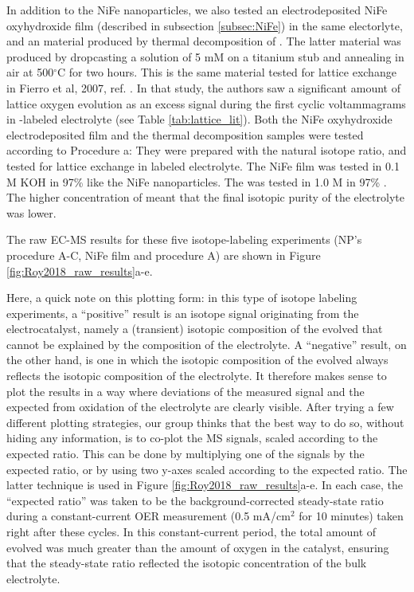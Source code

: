 In addition to the NiFe nanoparticles, we also tested an electrodeposited NiFe oxyhydroxide film (described in subsection \ref{subsec:NiFe}) in the same electorlyte, and an  material produced by thermal decomposition of . The latter material was produced by dropcasting a solution of 5 mM  on a titanium stub and annealing in air at 500$^\circ$C for two hours. This is the same material tested for lattice exchange in Fierro et al, 2007, ref. . In that study, the authors saw a significant amount of lattice oxygen evolution as an excess  signal during the first cyclic voltammagrams in -labeled electrolyte (see Table \ref{tab:lattice_lit}). Both the NiFe oxyhydroxide electrodeposited film and the thermal decomposition  samples were tested according to Procedure a: They were prepared with the natural isotope ratio, and tested for lattice exchange in labeled electrolyte. The NiFe film was tested in 0.1 M KOH in 97\%  like the NiFe nanoparticles. The  was tested in 1.0 M  in 97\% . The higher concentration of  meant that the final isotopic purity of the electrolyte was lower.

The raw EC-MS results for these five isotope-labeling experiments (NP's procedure A-C, NiFe film and  procedure A) are shown in Figure \ref{fig:Roy2018_raw_results}a-e. 

Here, a quick note on this plotting form: in this type of isotope labeling experiments, a ``positive'' result is an isotope signal originating from the electrocatalyst, namely a (transient) isotopic composition of the evolved  that cannot be explained by the composition of the electrolyte. A ``negative'' result, on the other hand, is one in which the isotopic composition of the evolved  always reflects the isotopic composition of the electrolyte. It therefore makes sense to plot the results in a way where deviations of the measured  signal and the expected  from oxidation of the electrolyte are clearly visible. After trying a few different plotting strategies, our group thinks that the best way to do so, without hiding any information, is to co-plot the MS signals, scaled according to the expected ratio. This can be done by multiplying one of the signals by the expected ratio, or by using two y-axes scaled according to the expected ratio. The latter technique is used in Figure \ref{fig:Roy2018_raw_results}a-e. In each case, the ``expected ratio'' was taken to be the background-corrected steady-state ratio during a constant-current OER measurement (0.5 mA/cm$^2$ for 10 minutes) taken right after these cycles. In this constant-current period, the total amount of  evolved was much greater than the amount of oxygen in the catalyst, ensuring that the steady-state ratio reflected the isotopic concentration of the bulk electrolyte.


